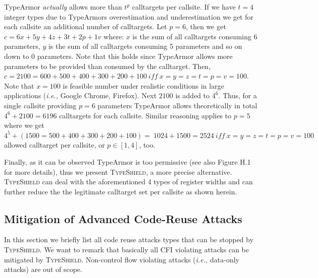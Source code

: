 TypeArmor {\textit{actually}} allows more than $t^{p}$ calltargets per callsite. If we have $t=4$ integer types due to TypeArmors overestimation
and underestimation we get for each callsite an additional number of calltargets. Let $p=6$, then we get $c = 6x + 5y+ 4z + 3t + 2p + 1v$ where:
$x$ is the sum of all calltargets consuming 6 parameters, 
$y$ is the sum of all calltargets consuming 5 parameters 
and so on down to 0 parameters. Note that this holds since TypeArmor allows more parameters to be provided than consumed by the calltarget.
Then, $c = 2100 = 600 + 500 + 400 + 300 + 200 + 100 \ iff \ x = y = z = t = p = v = 100$. 
Note that $x = 100$ is feasible number under realistic conditions in large applications (\textit{i.e.,} Google Chrome, Firefox). 
Next $2100$ is added to $4^{6}$. Thus, for a single callsite providing $p=6$ parameters TypeArmor allows theoretically in 
total $4^{6} + 2100 = 6196$ calltargets for each callsite.
Similar reasoning applies to $p=5$ where we get $4^{5} + (1500 = 500 + 400 + 300 + 200 + 100) = \ 1024 + 1500 = 2524 \ iff \ x=y=z=t=p=v=100$ 
allowed calltarget per callsite, or $p \in [1, 4]$, too.

Finally, as it can be observed TypeArmor is too permissive (see also Figure H.1~\cite{vci:asiaccs} for more details), thus 
we present \textsc{TypeShield}, a more precise alternative. \textsc{TypeShield} can deal with the aforementioned 4 types of register widths and can further reduce the the legitimate
calltarget set per callsite as shown herein.

\subsection{Mitigation of Advanced Code-Reuse Attacks}
\label{RQ7: Mitigation of Advanced Code-Reuse Attacks}
In this section we briefly list all code reuse attacks types that can be 
stopped  by \textsc{TypeShield}. We want to remark that basically all CFI violating 
attacks can be mitigated by \textsc{TypeShield}. Non-control flow violating attacks (\textit{i.e.,} data-only attacks)
are out of scope.

